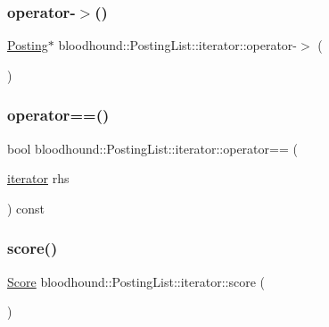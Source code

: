 \subsubsection{\texorpdfstring{operator-\/$>$()}{operator->()}}
{\footnotesize\ttfamily \mbox{\hyperlink{structbloodhound_1_1Posting}{Posting}}$\ast$ bloodhound\+::\+Posting\+List\+::iterator\+::operator-\/$>$ (\begin{DoxyParamCaption}{ }\end{DoxyParamCaption})\hspace{0.3cm}{\ttfamily [inline]}}

\mbox{\label{structbloodhound_1_1PostingList_1_1iterator_af82060f61f9231ee449e43ea347cab29}} 
\subsubsection{\texorpdfstring{operator==()}{operator==()}}
{\footnotesize\ttfamily bool bloodhound\+::\+Posting\+List\+::iterator\+::operator== (\begin{DoxyParamCaption}\item[{\mbox{\hyperlink{structbloodhound_1_1PostingList_1_1iterator}{iterator}}}]{rhs }\end{DoxyParamCaption}) const\hspace{0.3cm}{\ttfamily [inline]}}

\mbox{\label{structbloodhound_1_1PostingList_1_1iterator_a5c94dca7f430ac78f0db3f0fe2c01c75}} 
\subsubsection{\texorpdfstring{score()}{score()}}
{\footnotesize\ttfamily \mbox{\hyperlink{structbloodhound_1_1Score}{Score}} bloodhound\+::\+Posting\+List\+::iterator\+::score (\begin{DoxyParamCaption}{ }\end{DoxyParamCaption})\hspace{0.3cm}{\ttfamily [inline]}}



